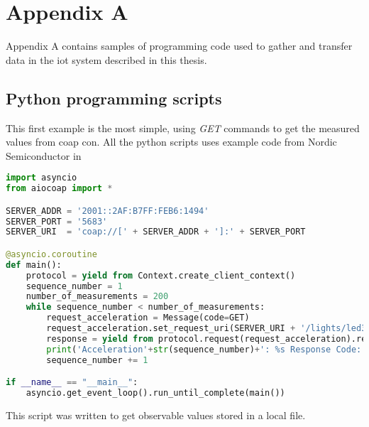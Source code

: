 \chapter{Appendix A}
\label{chp:appendix}

Appendix A contains samples of programming code used to gather and transfer data in the \gls{iot} system described in this thesis. 

\section{Python programming scripts}

This first example is the most simple, using \textit{GET} commands to get the measured values from \gls{coap} \gls{con}. All the python scripts uses example code from Nordic Semiconductor in 

\begin{lstlisting}[language=Python]
import asyncio
from aiocoap import *

SERVER_ADDR = '2001::2AF:B7FF:FEB6:1494'
SERVER_PORT = '5683'
SERVER_URI  = 'coap://[' + SERVER_ADDR + ']:' + SERVER_PORT

@asyncio.coroutine
def main():
	protocol = yield from Context.create_client_context()
	sequence_number = 1
	number_of_measurements = 200
	while sequence_number < number_of_measurements:
		request_acceleration = Message(code=GET)
		request_acceleration.set_request_uri(SERVER_URI + '/lights/led3')
		response = yield from protocol.request(request_acceleration).response
		print('Acceleration'+str(sequence_number)+': %s Response Code: %s\n'%(response.payload, response.code))		
		sequence_number += 1

if __name__ == "__main__":
	asyncio.get_event_loop().run_until_complete(main())

\end{lstlisting}

\newpage

This script was written to get observable values stored in a local file. 

